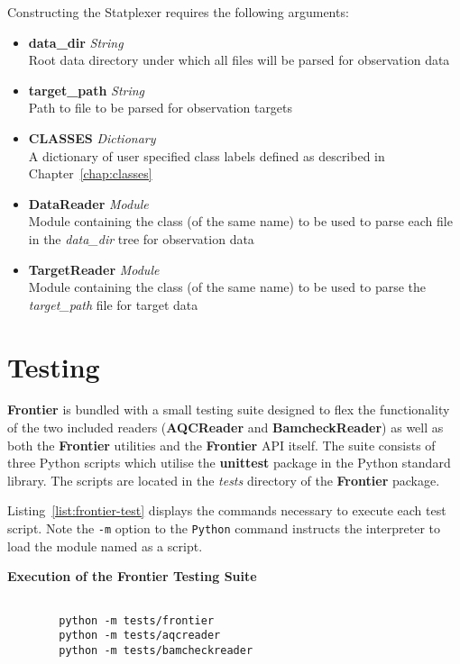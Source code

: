 Constructing the Statplexer requires the following arguments:

\begin{itemize}
    \item \textbf{data\_dir} \textit{String}\hfill\\
        Root data directory under which all files will be parsed for observation data
    \item \textbf{target\_path} \textit{String}\hfill\\
        Path to file to be parsed for observation targets
    \item \textbf{CLASSES} \textit{Dictionary}\hfill\\
        A dictionary of user specified class labels defined as described in
        Chapter~\ref{chap:classes}
    \item \textbf{DataReader} \textit{Module}\hfill\\
        Module containing the class (of the same name) to be used to parse each
        file in the \textit{data\_dir} tree for observation data
    \item \textbf{TargetReader} \textit{Module}\hfill\\
        Module containing the class (of the same name) to be used to parse the
        \textit{target\_path} file for target data
\end{itemize}


\section{Testing}

\textbf{Frontier} is bundled with a small testing suite designed to flex the
functionality of the two included readers (\textbf{AQCReader} and
\textbf{BamcheckReader}) as well as both the \textbf{Frontier} utilities and
the \textbf{Frontier} API itself. The suite consists of three Python scripts
which utilise the \textbf{unittest} package in the Python standard library.
The scripts are located in the \textit{tests} directory of the
\textbf{Frontier} package.

Listing~\ref{list:frontier-test} displays the commands necessary to execute each
test script. Note the \texttt{-m} option to the \texttt{Python} command
instructs the interpreter to load the module named as a script.

\begin{listing}[H]
    \caption[frontier-test]{\textbf{Execution of the Frontier Testing Suite}}
    \label{list:frontier-test}
    \begin{verbatim}

        python -m tests/frontier
        python -m tests/aqcreader
        python -m tests/bamcheckreader
    \end{verbatim}
\end{listing}

